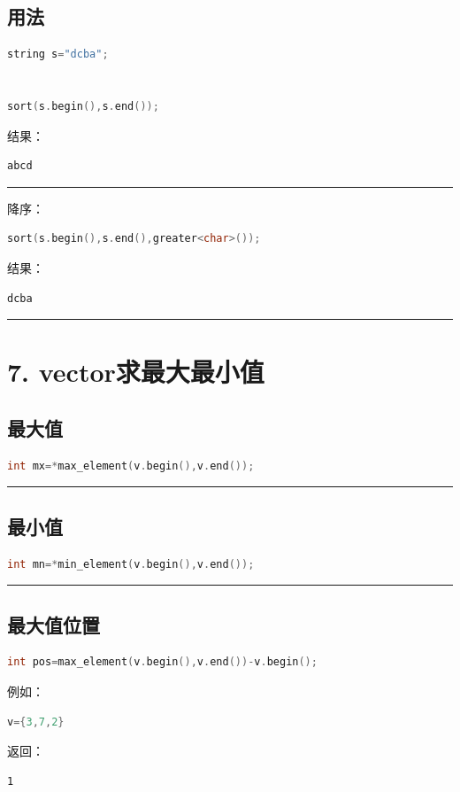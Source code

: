 \documentclass[9pt,twocolumn]{extarticle}
\begin{document}
\subsection{用法}
\begin{lstlisting}[language=C++]
string s="dcba";


sort(s.begin(),s.end());
\end{lstlisting}
结果：
\begin{lstlisting}
abcd
\end{lstlisting}

\noindent\rule{\linewidth}{0.4pt}

降序：
\begin{lstlisting}[language=C++]
sort(s.begin(),s.end(),greater<char>());
\end{lstlisting}
结果：
\begin{lstlisting}
dcba
\end{lstlisting}

\noindent\rule{\linewidth}{0.4pt}

\section{7. vector求最大最小值}

\subsection{最大值}
\begin{lstlisting}[language=C++]
int mx=*max_element(v.begin(),v.end());
\end{lstlisting}

\noindent\rule{\linewidth}{0.4pt}

\subsection{最小值}
\begin{lstlisting}[language=C++]
int mn=*min_element(v.begin(),v.end());
\end{lstlisting}

\noindent\rule{\linewidth}{0.4pt}

\subsection{最大值位置}
\begin{lstlisting}[language=C++]
int pos=max_element(v.begin(),v.end())-v.begin();
\end{lstlisting}
例如：
\begin{lstlisting}[language=C++]
v={3,7,2}
\end{lstlisting}
返回：
\begin{lstlisting}
1
\end{lstlisting}
\end{document}
